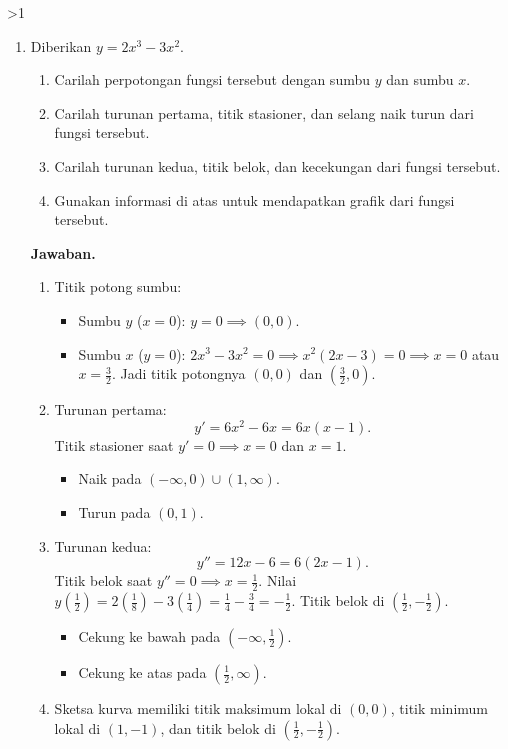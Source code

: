 \documentclass[12pt]{article}
\newcommand{\answername}{Jawaban}
\newenvironment{soaljawab}[1]{%
    \ifnum#1>1\clearpage\fi
    \begin{tcolorbox}[enhanced,breakable,height fill,height fixed for=all,
        sharp corners,colback=white,colframe=black,boxrule=0.4bp,
        boxsep=0pt,left=12bp,right=12bp,top=6bp,bottom=10bp,
        before skip=0pt,after skip=0pt,pad at break=8bp]
    \fontsize{12bp}{14bp}\selectfont
    \setlength{\abovedisplayskip}{8bp}
    \setlength{\belowdisplayskip}{8bp}
    \setlength{\abovedisplayshortskip}{8bp}
    \setlength{\belowdisplayshortskip}{8bp}
    \renewcommand{\arraystretch}{1.15}
    \begin{enumerate}[start=#1,topsep=0pt]
}{%
    \end{enumerate}
    \end{tcolorbox}
}
\newcommand{\jawaban}{\par\medskip\textbf{\answername.}\par\smallskip}
\begin{document}
\begin{soaljawab}{2}
\item Diberikan $y = 2x^3 - 3x^2$.
        \begin{enumerate}
          \item Carilah perpotongan fungsi tersebut dengan sumbu $y$ dan sumbu $x$.
          \item Carilah turunan pertama, titik stasioner, dan selang naik turun dari fungsi tersebut.
          \item Carilah turunan kedua, titik belok, dan kecekungan dari fungsi tersebut.
          \item Gunakan informasi di atas untuk mendapatkan grafik dari fungsi tersebut.
        \end{enumerate}
\jawaban
\begin{enumerate}
          \item Titik potong sumbu:
                \begin{itemize}
                  \item Sumbu $y$ ($x = 0$): $y = 0 \implies (0, 0)$.
                  \item Sumbu $x$ ($y = 0$): $2x^3 - 3x^2 = 0 \implies x^2(2x - 3) = 0 \implies x = 0$ atau $x = \frac{3}{2}$. Jadi titik potongnya $(0, 0)$ dan $\left(\frac{3}{2}, 0\right)$.
                \end{itemize}
          \item Turunan pertama:
                \[
                  y' = 6x^2 - 6x = 6x(x - 1).
                \]
                Titik stasioner saat $y' = 0 \implies x = 0$ dan $x = 1$.
                \begin{itemize}
                  \item Naik pada $(-\infty, 0) \cup (1, \infty)$.
                  \item Turun pada $(0, 1)$.
                \end{itemize}
          \item Turunan kedua:
                \[
                  y'' = 12x - 6 = 6(2x - 1).
                \]
                Titik belok saat $y'' = 0 \implies x = \frac{1}{2}$.
                Nilai $y\left(\frac{1}{2}\right) = 2\left(\frac{1}{8}\right) - 3\left(\frac{1}{4}\right) = \frac{1}{4} - \frac{3}{4} = -\frac{1}{2}$. Titik belok di $\left(\frac{1}{2}, -\frac{1}{2}\right)$.
                \begin{itemize}
                  \item Cekung ke bawah pada $\left(-\infty, \frac{1}{2}\right)$.
                  \item Cekung ke atas pada $\left(\frac{1}{2}, \infty\right)$.
                \end{itemize}
          \item Sketsa kurva memiliki titik maksimum lokal di $(0, 0)$, titik minimum lokal di $(1, -1)$, dan titik belok di $\left(\frac{1}{2}, -\frac{1}{2}\right)$.
        \end{enumerate}
\end{soaljawab}
\end{document}
